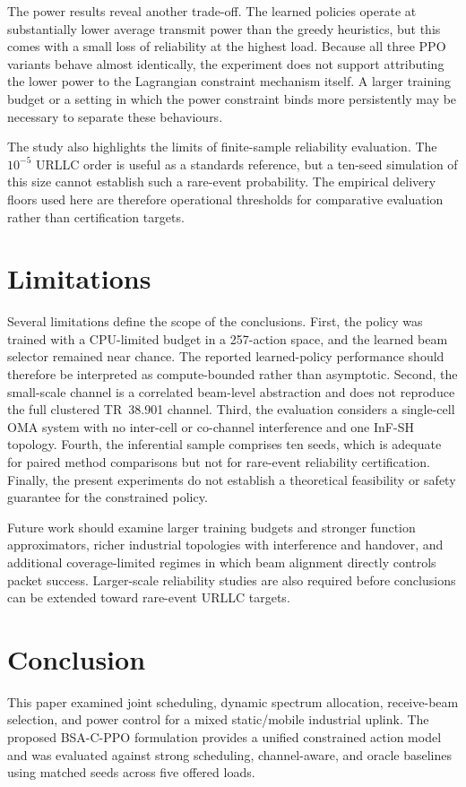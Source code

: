 \documentclass[number]{autarticle}
\begin{document}
The power results reveal another trade-off. The learned policies operate at substantially lower average transmit power than the greedy heuristics, but this comes with a small loss of reliability at the highest load. Because all three PPO variants behave almost identically, the experiment does not support attributing the lower power to the Lagrangian constraint mechanism itself. A larger training budget or a setting in which the power constraint binds more persistently may be necessary to separate these behaviours.

The study also highlights the limits of finite-sample reliability evaluation. The $10^{-5}$ URLLC order is useful as a standards reference, but a ten-seed simulation of this size cannot establish such a rare-event probability. The empirical delivery floors used here are therefore operational thresholds for comparative evaluation rather than certification targets.

\section{Limitations}\label{limitations}
Several limitations define the scope of the conclusions. First, the policy was trained with a CPU-limited budget in a 257-action space, and the learned beam selector remained near chance. The reported learned-policy performance should therefore be interpreted as compute-bounded rather than asymptotic. Second, the small-scale channel is a correlated beam-level abstraction and does not reproduce the full clustered TR~38.901 channel. Third, the evaluation considers a single-cell OMA system with no inter-cell or co-channel interference and one InF-SH topology. Fourth, the inferential sample comprises ten seeds, which is adequate for paired method comparisons but not for rare-event reliability certification. Finally, the present experiments do not establish a theoretical feasibility or safety guarantee for the constrained policy.

Future work should examine larger training budgets and stronger function approximators, richer industrial topologies with interference and handover, and additional coverage-limited regimes in which beam alignment directly controls packet success. Larger-scale reliability studies are also required before conclusions can be extended toward rare-event URLLC targets.

\section{Conclusion}\label{conclusion}
This paper examined joint scheduling, dynamic spectrum allocation, receive-beam selection, and power control for a mixed static/mobile industrial uplink. The proposed BSA-C-PPO formulation provides a unified constrained action model and was evaluated against strong scheduling, channel-aware, and oracle baselines using matched seeds across five offered loads.
\end{document}
